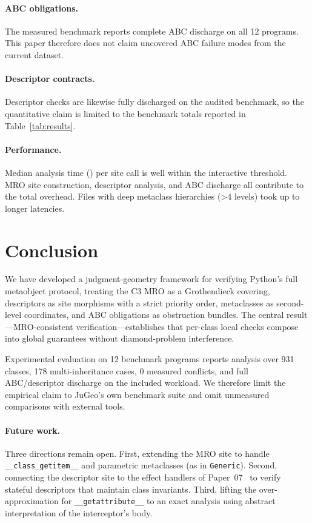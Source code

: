 \documentclass[11pt]{article}
\newcommand{\getattribute}{\texttt{\_\_getattribute\_\_}}
\begin{document}
\paragraph{ABC obligations.}
The measured benchmark reports complete ABC discharge on all 12
programs.  This paper therefore does not claim uncovered ABC failure
modes from the current dataset.

\paragraph{Descriptor contracts.}
Descriptor checks are likewise fully discharged on the audited
benchmark, so the quantitative claim is limited to the benchmark totals
reported in Table~\ref{tab:results}.

\paragraph{Performance.}
Median analysis time (\subSiteMeanTime) per site call is well within the
interactive threshold.  MRO site construction, descriptor analysis,
and ABC discharge all contribute to the total overhead.
Files with deep metaclass hierarchies (\textgreater 4 levels) took up
to longer latencies.

\section{Conclusion}\label{sec:conc}

We have developed a judgment-geometry framework for verifying Python's
full metaobject protocol, treating the C3 MRO as a Grothendieck
covering, descriptors as site morphisms with a strict priority order,
metaclasses as second-level coordinates, and ABC obligations as
obstruction bundles.  The central result---MRO-consistent
verification---establishes that per-class local checks compose into
global guarantees without diamond-problem interference.

Experimental evaluation on 12 benchmark programs reports analysis over
931 classes, 178 multi-inheritance cases, 0 measured conflicts, and
full ABC/descriptor discharge on the included workload.  We therefore
limit the empirical claim to JuGeo's own benchmark suite and omit
unmeasured comparisons with external tools.

\paragraph{Future work.}
Three directions remain open.
First, extending the MRO site to handle \texttt{\_\_class\_getitem\_\_}
and parametric metaclasses (as in \texttt{Generic}).
Second, connecting the descriptor site to the effect handlers of
Paper~07~\cite{jugeo-paper07} to verify stateful descriptors that
maintain class invariants.
Third, lifting the over-approximation for \getattribute{} to an exact
analysis using abstract interpretation of the interceptor's body.
\end{document}
